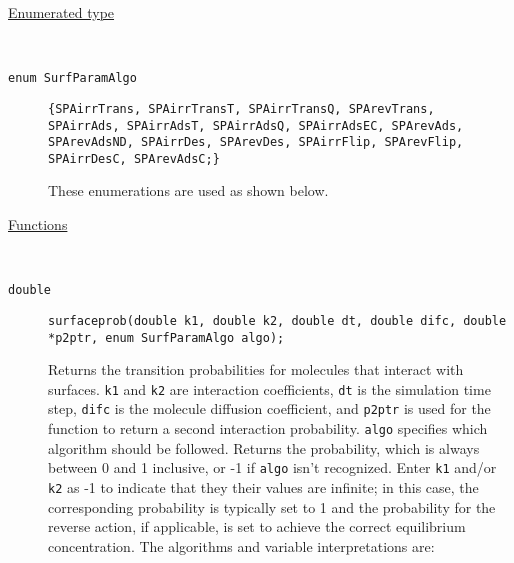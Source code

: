 \documentclass[11pt]{article}
\newcommand {\ttt} {\texttt}
\begin{document}
\begin{description}

\item[\underline{Enumerated type}]
\hfill \\

\item[\ttt{enum SurfParamAlgo}]
\ttt{\{SPAirrTrans, SPAirrTransT, SPAirrTransQ, SPArevTrans, SPAirrAds, SPAirrAdsT, SPAirrAdsQ, SPAirrAdsEC, SPArevAds, SPArevAdsND, SPAirrDes, SPArevDes, SPAirrFlip, SPArevFlip, SPAirrDesC, SPArevAdsC;\}}

These enumerations are used as shown below.

\item[\underline{Functions}]
\hfill \\

\item[\ttt{double}]
\ttt{surfaceprob(double k1, double k2, double dt, double difc, double *p2ptr, enum SurfParamAlgo algo);}

Returns the transition probabilities for molecules that interact with surfaces. \ttt{k1} and \ttt{k2} are interaction coefficients, \ttt{dt} is the simulation time step, \ttt{difc} is the molecule diffusion coefficient, and \ttt{p2ptr} is used for the function to return a second interaction probability. \ttt{algo} specifies which algorithm should be followed. Returns the probability, which is always between 0 and 1 inclusive, or -1 if \ttt{algo} isn't recognized. Enter \ttt{k1} and/or \ttt{k2} as -1 to indicate that they their values are infinite; in this case, the corresponding probability is typically set to 1 and the probability for the reverse action, if applicable, is set to achieve the correct equilibrium concentration. The algorithms and variable interpretations are:


\end{description}
\end{document}

